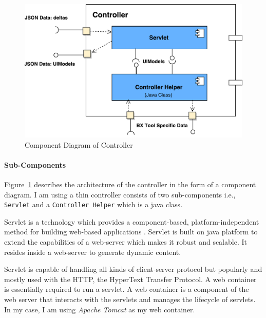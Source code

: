 \begin{figure}
	\includegraphics[width=1\textwidth]{figures/Component_Diagram-Controller}
	\caption{Component Diagram of Controller}
	\label{fig:Component_Diagram-Controller}
\end{figure}

\paragraph{Sub-Components}
Figure~\ref{fig:Component_Diagram-Controller} describes the architecture of the controller in the form of a component diagram. I am using a thin controller consists of two sub-components i.e., \texttt{Servlet} and a \texttt{Controller Helper} which is a java class.

Servlet is a technology which provides a component-based, platform-independent method for building web-based applications \cite{servlet}. Servlet is built on java platform to extend the capabilities of a web-server which makes it robust and scalable. It resides inside a web-server to generate dynamic content.

Servlet is capable of handling all kinds of client-server protocol but popularly and mostly used with the HTTP, the HyperText Transfer Protocol. A web container is essentially required to run a servlet. A web container is a component of the web server that interacts with the servlets and manages the lifecycle of servlets. In my case, I am using \textit{Apache Tomcat} as my web container. 

